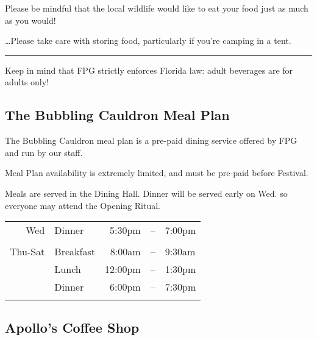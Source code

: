\documentclass[9pt,twoside,openright,final,article,letterpaper]{memoir}
\renewcommand{\pfbreakdisplay}{%
  \needspace{24pt}%
  \vspace{8pt}\\\ding{76}\quad\ding{77}\quad\ding{78}\\%
  \vspace{11pt}}
\let\oldsubsection=\subsection
\renewcommand{\subsection}[1]{%
  \vspace{6pt}
  \needspace{1.25in}
  \oldsubsection{#1}
  \nopagebreak}
\begin{document}
\begin{multicols}{2}

  Please be mindful that the local wildlife would like to eat your
  food just as much as you would!

  \ldots Please take care with
  storing food, particularly if you're camping in a tent.

  \fancybreak{\pfbreakdisplay}

  Keep in mind that FPG strictly enforces Florida law: adult beverages
  are for adults only!

  \subsection{The Bubbling Cauldron Meal Plan}

  The Bubbling Cauldron meal plan is a pre-paid dining service offered
  by FPG and run by our staff.

  {\small Meal Plan availability is extremely limited, and must be
    pre-paid before Festival.}

  Meals are served in the Dining Hall. {\small Dinner will be served
    early on Wed. so everyone may attend the Opening Ritual.}


\begin{center}
  \begin{tabular}{rlrcl}
    \\ \hline
    Wed & Dinner & 5:30pm&--&7:00pm  \\ \\
    Thu-Sat & Breakfast & 8:00am&--&9:30am \\
    & Lunch & 12:00pm&--&1:30pm \\
    & Dinner & 6:00pm&--&7:30pm \\
    \hline \\
  \end{tabular}
\end{center}


  \subsection{Apollo's Coffee Shop }





\end{multicols}
\end{document}
